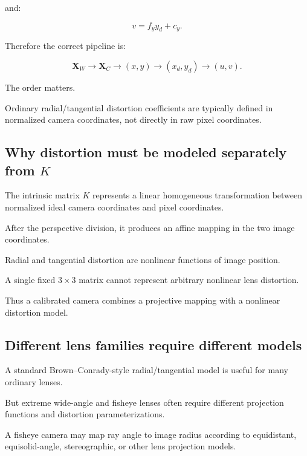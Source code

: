 and:

\[
 \boxed{ v=f_yy_d+c_y }.
\]

Therefore the correct pipeline is:

\[
 \boxed{ \mathbf X_W \rightarrow \mathbf X_C \rightarrow (x,y) \rightarrow (x_d,y_d) \rightarrow (u,v) }.
\]

The order matters.

Ordinary radial/tangential distortion coefficients are typically defined in normalized camera coordinates, not directly in raw pixel coordinates.

\subsection{\texorpdfstring{Why distortion must be modeled separately from \(K\)}{Why distortion must be modeled separately from K}}\label{02-foundations-ii-ch035-why-distortion-must-be-modeled-separately-from-k}

\hypertarget{02-foundations-ii-ch035-why-distortion-must-be-modeled-separately-from-k}{}

The intrinsic matrix \(K\) represents a linear homogeneous transformation between normalized ideal camera coordinates and pixel coordinates.

After the perspective division, it produces an affine mapping in the two image coordinates.

Radial and tangential distortion are nonlinear functions of image position.

A single fixed \(3\times3\) matrix cannot represent arbitrary nonlinear lens distortion.

Thus a calibrated camera combines a projective mapping with a nonlinear distortion model.

\subsection{Different lens families require different models}\label{02-foundations-ii-ch035-different-lens-families-require-different-models}

\hypertarget{02-foundations-ii-ch035-different-lens-families-require-different-models}{}

A standard Brown--Conrady-style radial/tangential model is useful for many ordinary lenses.

But extreme wide-angle and fisheye lenses often require different projection functions and distortion parameterizations.

A fisheye camera may map ray angle to image radius according to equidistant, equisolid-angle, stereographic, or other lens projection models.

